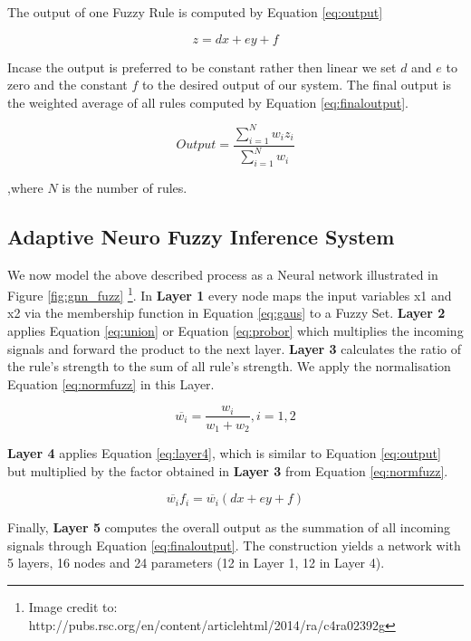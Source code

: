 The output of one Fuzzy Rule is computed by Equation \ref{eq:output}


\begin{equation} \label{eq:output}
 z = dx + ey + f  \end{equation}
 
Incase the output is preferred to be constant rather then linear we set $d$ and $e$ to zero and the constant  $f$ to the desired output of our system. The final output is the weighted average of all rules computed by Equation \ref{eq:finaloutput}.

\begin{equation} \label{eq:finaloutput}
Output = \frac { \sum\limits_{i=1}^N  w_i z_i} {\sum\limits_{i=1}^N  w_i } \end{equation}

,where $N$ is the number of rules. 

\subsection{Adaptive Neuro Fuzzy Inference System }

We now model the above described process as a Neural network illustrated in Figure \ref{fig:gnn_fuzz}  \footnote{Image credit to: http://pubs.rsc.org/en/content/articlehtml/2014/ra/c4ra02392g}. In \textbf{Layer 1} every node maps the input variables x1 and x2 via the membership function in Equation \ref{eq:gaus} to a Fuzzy Set.  \textbf{Layer 2} applies Equation \ref{eq:union} or Equation \ref{eq:probor} which multiplies the incoming signals and forward the product to the next layer. \textbf {Layer 3} calculates the ratio of the rule's strength to the sum of all rule's strength. We apply the normalisation Equation \ref{eq:normfuzz} in this Layer. 

\begin{equation} \label{eq:normfuzz}
\overline{w_i} =  \frac{w_i}{w_1 + w_2}, i = 1,2 \end{equation}

 \textbf{Layer 4} applies Equation \ref{eq:layer4}, which is similar to Equation \ref{eq:output} but multiplied by the factor obtained in \textbf{Layer 3} from Equation \ref{eq:normfuzz}. 
 
  \begin{equation} \label{eq:layer4}
 \overline{w_i} f_i =  \overline{w_i }(dx + ey + f) \end{equation}
 
 Finally, \textbf{Layer 5} computes the overall output as the summation of all incoming signals through Equation \ref{eq:finaloutput}. The construction yields a network with 5 layers,  16 nodes and 24 parameters (12 in Layer 1, 12 in Layer 4). 
 
